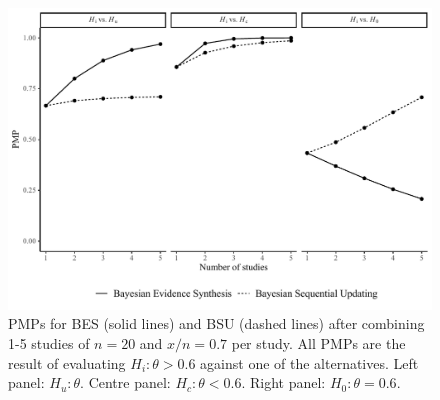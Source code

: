 \documentclass[11pt,reqno]{article}
\begin{document}
\begin{figure}[ht]
   \centerline{\includegraphics[width=14cm]{r-files-bes-klugkist-volker-2022/Figures/bes_bsu_7_pmp}}
 \caption{PMPs for BES (solid lines) and BSU (dashed lines) after combining 1-5 studies of $n=20$ and $x/n=0.7$ per study. All PMPs are the result of evaluating $H_i: \theta>0.6$ against one of the alternatives. Left panel: $H_u: \theta$. Centre panel: $H_c: \theta<0.6$. Right panel: $H_0: \theta=0.6$.}
 \label{Aggregated}
\end{figure}
\end{document}
